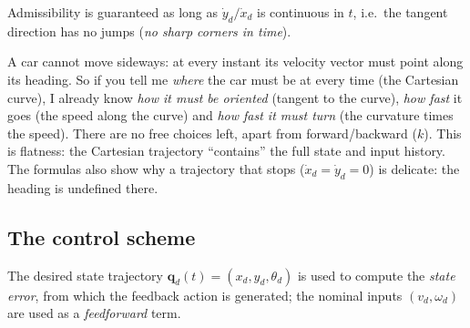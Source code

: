 \documentclass[11pt,a4paper]{article}
\newcommand{\vect}[1]{\bm{#1}}
\newcommand{\vd}{v_d}
\newcommand{\omd}{\omega_d}
\newcommand{\qd}{\vect{q}_d}
\theoremstyle{plain}
\theoremstyle{definition}
\theoremstyle{remark}
\begin{document}
Admissibility is guaranteed as long as $\dot y_d/\dot x_d$ is continuous in $t$, i.e.\ the tangent direction has no jumps (\emph{no sharp corners in time}).

\begin{intuition}
A car cannot move sideways: at every instant its velocity vector must point along its heading. So if you tell me \emph{where} the car must be at every time (the Cartesian curve), I already know \emph{how it must be oriented} (tangent to the curve), \emph{how fast} it goes (the speed along the curve) and \emph{how fast it must turn} (the curvature times the speed). There are no free choices left, apart from forward/backward ($k$). This is flatness: the Cartesian trajectory ``contains'' the full state and input history. The formulas also show why a trajectory that stops ($\dot x_d=\dot y_d=0$) is delicate: the heading is undefined there.
\end{intuition}

\subsection{The control scheme}

The desired state trajectory $\qd(t)=(x_d,y_d,\theta_d)$ is used to compute the \emph{state error}, from which the feedback action is generated; the nominal inputs $(\vd,\omd)$ are used as a \emph{feedforward} term.
\end{document}
